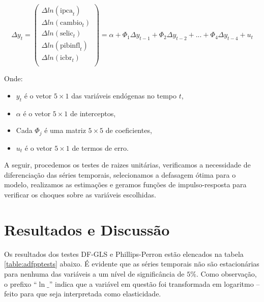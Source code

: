 \documentclass[12pt,oneside,a4paper,chapter=TITLE,english,brazil,sumario=abnt-6027-2012]{abntex2}
\begin{document}
\begin{equation}
	\label{eqn:modvar}
	\Delta y_t
	=
	\begin{pmatrix}
		\Delta ln(\text{ipca}_t) \\
		\Delta ln(\text{cambio}_t) \\
		\Delta ln(\text{selic}_t) \\
		\Delta ln(\text{pibinfl}_t) \\
		\Delta ln(\text{icbr}_t) \\
	\end{pmatrix}
	=
	\alpha + \Phi_1 \Delta y_{t-1} + \Phi_2 \Delta y_{t-2} + ... + \Phi_4 \Delta y_{t-4} + u_t
\end{equation}

\vspace{0ex}

Onde:

\begin{itemize}
	\item $y_t$ é o vetor $5 \times 1$ das variáveis endógenas no tempo $t$,
	\item $\alpha$ é o vetor $5 \times 1$ de interceptos,
	\item Cada $\Phi_j$ é uma matriz $5 \times 5$ de coeficientes,
	\item $u_t$ é o vetor $5 \times 1$ de termos de erro.
\end{itemize}

A seguir, procedemos os testes de raizes unitárias, verificamos a necessidade de diferenciação das séries temporais, selecionamos a defasagem ótima para o modelo, realizamos as estimações e geramos funções de impulso-resposta para verificar os choques sobre as variáveis escolhidas.

\section{Resultados e Discussão}

Os resultados dos testes DF-GLS e Phillips-Perron estão elencados na tabela \ref{table:adfpptests} abaixo. É evidente que as séries temporais não são estacionárias para nenhuma das variáveis a um nível de significância de $5\%$. Como observação, o prefixo ``$\ln\_$'' indica que a variável em questão foi transformada em logaritmo -- feito para que seja interpretada como elasticidade.
\end{document}
